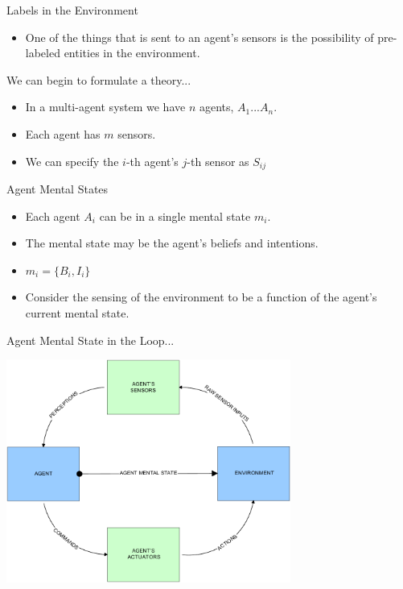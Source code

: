 \documentclass[aspectratio=1610,xcolor=dvipsnames,t]{beamer}
\begin{document}
\begin{frame}{Labels in the Environment}  
    \begin{itemize} 
        \item One of the things that is sent to an agent's sensors
              is the possibility of pre-labeled entities in the 
              environment. 
    \end{itemize} 
\end{frame} 

\begin{frame}{We can begin to formulate a theory...}
    \begin{itemize}
        \item In a multi-agent system we have $n$ agents, $A_1 ... A_n$. 
        \item Each agent has $m$ sensors.
        \item We can specify the $i$-th agent's $j$-th sensor as $S_{ij}$
    \end{itemize} 
\end{frame} 

\begin{frame}{Agent Mental States}
    \begin{itemize} 
        \item Each agent $A_i$ can be in a single mental state $m_i$. 
        \item The mental state may be the agent's beliefs and intentions.
        \item $m_i = \{B_i, I_i\}$
        \item Consider the sensing of the environment to be a function of the
              agent's current mental state. 
    \end{itemize} 
\end{frame} 

\begin{frame}{Agent Mental State in the Loop...}
    \begin{center} 
        \includegraphics[width=0.7\textwidth]{mentalstateinloop} 
    \end{center} 
\end{frame} 
\end{document}
